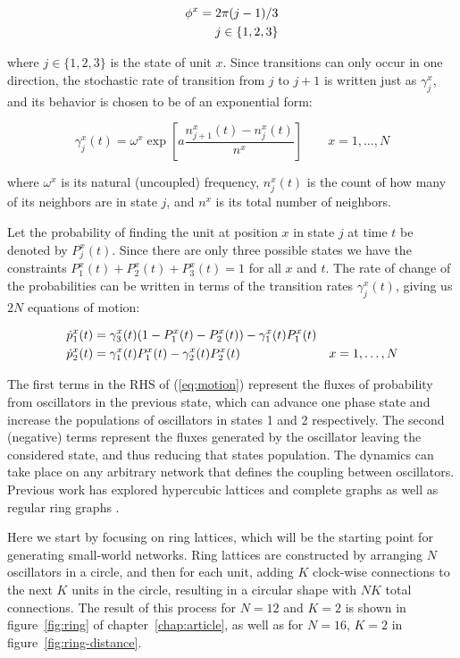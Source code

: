 \begin{align}
    \phi^x = 2\pi (j-1)/3 \\
    j \in \{1,2,3\} \notag
\end{align}

\noindent where $j\in\{1,2,3\}$ is the state of unit $x$. Since transitions can only occur in one direction, the stochastic rate of
transition from $j$ to $j+1$ is written just as $\gamma^x_j$, and its behavior is chosen to be of an exponential form:

\begin{equation}
    \gamma^x_j(t) = \omega^x\exp\left[ a\frac{n^x_{j+1}(t) - n^x_j(t)}{n^x} \right] \qquad x=1,\dots, N
    \label{rate}
\end{equation}

\noindent where $\omega^x$ is its natural (uncoupled) frequency, $n^x_j(t)$ is the count of how many of its neighbors are in state $j$,
and $n^x$ is its total number of neighbors.

Let the probability of finding the unit at position $x$ in state $j$ at time $t$ be denoted by $P_j^x(t)$. Since there are only three
possible states we have the constraints $P_1^x(t)+P_2^x(t)+P_3^x(t)=1$ for all $x$ and $t$. The rate of change of the probabilities can
be written in terms of the transition rates $\gamma^x_j(t)$, giving us $2N$ equations of motion:

\begin{align}
    \dot{p}^x_1(t) &= \gamma^x_3(t)(1 - P_1^x(t) - P_2^x(t)) - \gamma^x_1(t) P_1^x(t) & \notag\\
    \dot{p}^x_2(t) &= \gamma^x_1(t)P_1^x(t) - \gamma^x_2(t) P_2^x(t) &x=1,\dots,N
    \label{eq:motion}
\end{align}

\noindent The first terms in the RHS of (\ref{eq:motion}) represent the fluxes of probability from oscillators in the previous state,
which can advance one phase state and increase the populations of oscillators in states 1 and 2 respectively. The second (negative)
terms represent the fluxes generated by the oscillator leaving the considered state, and thus reducing that states population. The
dynamics can take place on any arbitrary network that defines the coupling between oscillators. Previous work has explored hypercubic
lattices and complete graphs as well as regular ring graphs \cite{Wood06a,assis2011infinite,escaff2014arrays}.

Here we start by focusing on ring lattices, which will be the starting point for generating small-world networks. Ring lattices are
constructed by arranging $N$ oscillators in a circle, and then for each unit, adding $K$ clock-wise connections to the next $K$ units
in the circle, resulting in a circular shape with $NK$ total connections. The result of this process for $N=12$ and $K=2$ is shown in
figure~\ref{fig:ring} of chapter~\ref{chap:article}, as well as for $N=16$, $K=2$ in figure~\ref{fig:ring-distance}.


